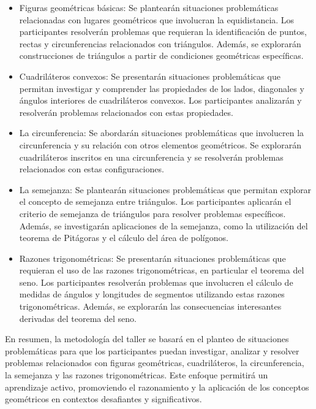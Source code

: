 \begin{itemize}
	\item Figuras geométricas básicas: Se plantearán situaciones problemáticas relacionadas con lugares geométricos que involucran la equidistancia. Los participantes resolverán problemas que requieran la identificación de puntos, rectas y circunferencias relacionados con triángulos. Además, se explorarán construcciones de triángulos a partir de condiciones geométricas específicas. \textcite{coxeter1997}
	
	\item Cuadriláteros convexos: Se presentarán situaciones problemáticas que permitan investigar y comprender las propiedades de los lados, diagonales y ángulos interiores de cuadriláteros convexos. Los participantes analizarán y resolverán problemas relacionados con estas propiedades. \textcite{coxeter1997,eves1963}
	
	\item La circunferencia: Se abordarán situaciones problemáticas que involucren la circunferencia y su relación con otros elementos geométricos. Se explorarán cuadriláteros inscritos en una circunferencia y se resolverán problemas relacionados con estas configuraciones. \textcite{coxeter1997}
	
	\item La semejanza: Se plantearán situaciones problemáticas que permitan explorar el concepto de semejanza entre triángulos. Los participantes aplicarán el criterio de semejanza de triángulos para resolver problemas específicos. Además, se investigarán aplicaciones de la semejanza, como la utilización del teorema de Pitágoras y el cálculo del área de polígonos. \textcite{fuxman2019}
	
	\item Razones trigonométricas: Se presentarán situaciones problemáticas que requieran el uso de las razones trigonométricas, en particular el teorema del seno. Los participantes resolverán problemas que involucren el cálculo de medidas de ángulos y longitudes de segmentos utilizando estas razones trigonométricas. Además, se explorarán las consecuencias interesantes derivadas del teorema del seno. \textcite{durell2003}
\end{itemize}

En resumen, la metodología del taller se basará en el planteo de situaciones problemáticas para que los participantes puedan investigar, analizar y resolver problemas relacionados con figuras geométricas, cuadriláteros, la circunferencia, la semejanza y las razones trigonométricas. Este enfoque permitirá un aprendizaje activo, promoviendo el razonamiento y la aplicación de los conceptos geométricos en contextos desafiantes y significativos. \textcite{oma2023}

